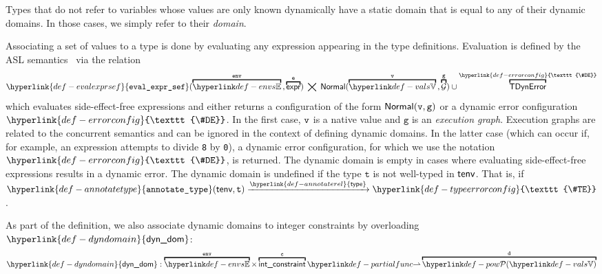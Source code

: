\documentclass{book}
\newcommand\Normal[0]{\textsf{Normal}}
\newcommand\vg[0]{\texttt{g}}
\newcommand\env[0]{\texttt{env}}
\newcommand\evalexprsef[1]{\hyperlink{def-evalexprsef}{\texttt{eval\_expr\_sef}}(#1)}
\newcommand\XGraphs[0]{\mathcal{G}}
\newcommand\TError[0]{\textsf{TDynError}}
\newcommand\ErrorConfig[0]{\hyperlink{def-errorconfig}{\texttt{\#DE}}}
\newcommand\dynamicdomain[0]{\hyperlink{def-dyndomain}{\textsf{dyn\_dom}}}
\newcommand\TypeErrorConfig[0]{\hyperlink{def-typeerrorconfig}{\texttt{\#TE}}}
\newcommand\annotaterel[0]{\hyperlink{def-annotaterel}{\textsf{type}}}
\newcommand\typearrow[0]{\xrightarrow{\annotaterel}}
\newcommand\annotatetype[1]{\hyperlink{def-annotatetype}{\texttt{annotate\_type}}(#1)}
\newcommand\vc[0]{\texttt{c}}
\newcommand\vt[0]{\texttt{t}}
\begin{document}
Types that do not refer to variables whose values are only known dynamically have
a static domain that is equal to any of their dynamic domains.
In those cases, we simply refer to their \emph{domain}.

Associating a set of values to a type is done by evaluating any expression appearing
in the type definitions. Evaluation is defined by the ASL semantics~\cite{ASLSemanticsReference}
via the relation
\hypertarget{def-evalexprsef}{}
\[
  \evalexprsef{\overname{\envs}{\env} \aslsep \overname{\expr}{\ve}} \;\aslrel\;
  \Normal(\overname{\vals}{\vv}\aslsep\overname{\XGraphs}{\vg}) \cup
  \overname{\TError}{\ErrorConfig}
\]
\hypertarget{def-errorconfig}{}
which evaluates side-effect-free expressions and either returns
a configuration of the form $\Normal(\vv,\vg)$ or a dynamic error configuration $\ErrorConfig$.
In the first case, $\texttt{v}$ is a native value and $\vg$
is an \emph{execution graph}. Execution graphs are related to the concurrent semantics
and can be ignored in the context of defining dynamic domains.
In the latter case (which can occur if, for example, an expression attempts to divide
\texttt{8} by \texttt{0}), a dynamic error configuration, for which we use the notation
$\ErrorConfig$, is returned.
%
The dynamic domain is empty in cases where evaluating side-effect-free expressions
results in a dynamic error.
%
The dynamic domain is undefined if the type $\vt$ is not well-typed in $\textsf{tenv}$.
That is, if $\annotatetype{\tenv, \vt} \typearrow \TypeErrorConfig$.

As part of the definition, we also associate dynamic domains to integer constraints
by overloading $\dynamicdomain$:
\[
  \dynamicdomain : \overname{\envs}{\env} \times \overname{\intconstraint}{\vc}
  \partialto \overname{\pow{\vals}}{\vd}
\]
\end{document}
